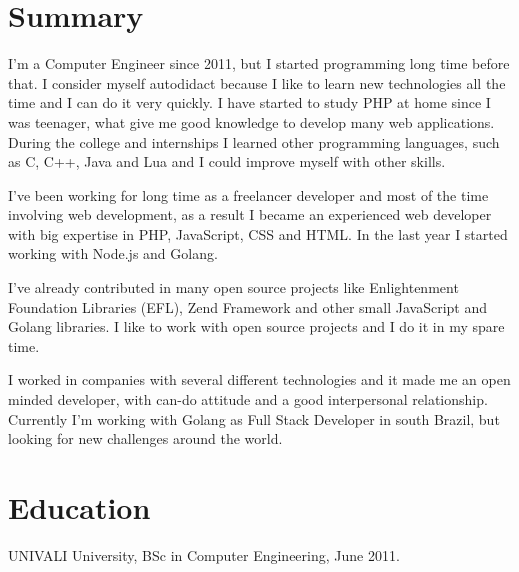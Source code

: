 \documentclass[margin]{res}
\begin{document}
\address{Florianópolis, BR \\ xguiga@gmail.com \\ Phone: +55 (48) 9640-3883 }

\begin{resume}

\section{Summary}
I'm a Computer Engineer since 2011, but I started programming long time before that. I consider myself autodidact because I like to learn new technologies all the time and I can do it very quickly. I have started to study PHP at home since I was teenager, what give me good knowledge to develop many web applications.  During the college and internships I learned other programming languages, such as C, C++, Java and Lua and I could improve myself with other skills.

I've been working for long time as a freelancer developer and most of the time involving web development, as a result I became an experienced web developer with big expertise in PHP, JavaScript, CSS and HTML. In the last year I started working with Node.js and Golang. 

I've already contributed in many open source projects like Enlightenment Foundation Libraries (EFL), Zend Framework and other small JavaScript and Golang libraries. I like to work with open source projects and I do it in my spare time.

I worked in companies with several different technologies and it made me an open minded developer, with can-do attitude and a good interpersonal relationship. Currently I’m working with Golang as Full Stack Developer in south Brazil, but looking for new challenges around the world.

\section{Education} UNIVALI University, BSc in Computer Engineering, June 2011.


\end{resume}
\end{document}
